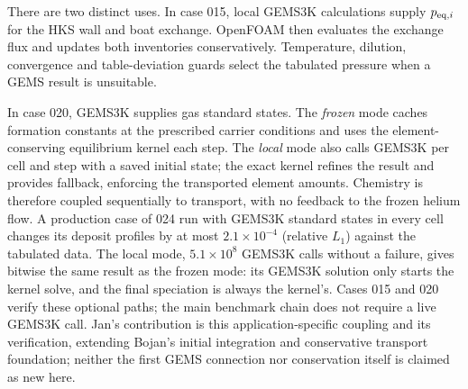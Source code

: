 \documentclass[10pt,a4paper]{article}
\begin{document}
There are two distinct uses. In case 015, local GEMS3K calculations supply
$p_{{\rm eq},i}$ for the HKS wall and boat exchange. OpenFOAM then evaluates
the exchange flux and updates both inventories conservatively. Temperature,
dilution, convergence and table-deviation guards select the tabulated
pressure when a GEMS result is unsuitable.

In case 020, GEMS3K supplies gas standard states. The \emph{frozen} mode
caches formation constants at the prescribed carrier conditions and uses
the element-conserving equilibrium kernel each step. The \emph{local} mode
also calls GEMS3K per cell and step with a saved initial state; the exact
kernel refines the result and provides fallback, enforcing the transported
element amounts. Chemistry is therefore coupled sequentially to transport,
with no feedback to the frozen helium flow. A production case of 024 run
with GEMS3K standard states in every cell changes its deposit profiles by
at most $2.1\times10^{-4}$ (relative $L_1$) against the tabulated data.
The local mode, $5.1\times10^{8}$ GEMS3K calls without a failure, gives
bitwise the same result as the frozen mode: its GEMS3K solution only
starts the kernel solve, and the final speciation is always the
kernel's. Cases 015 and 020 verify these
optional paths; the main benchmark chain does not require a live GEMS3K
call. Jan's contribution is this application-specific coupling and its
verification, extending Bojan's initial integration and conservative
transport foundation; neither the first GEMS connection nor conservation
itself is claimed as new here.
\end{document}
